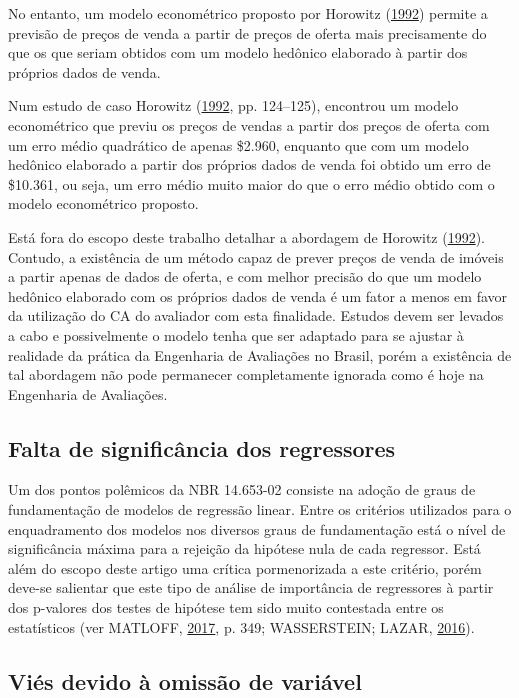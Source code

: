 \documentclass[
  a4paper, 11pt]{article}
\begin{document}
No entanto, um modelo econométrico proposto por Horowitz
(\protect\hyperlink{ref-horowitz}{1992}) permite a previsão de preços de
venda a partir de preços de oferta mais precisamente do que os que
seriam obtidos com um modelo hedônico elaborado à partir dos próprios
dados de venda.

Num estudo de caso Horowitz (\protect\hyperlink{ref-horowitz}{1992}, pp.
124--125), encontrou um modelo econométrico que previu os preços de
vendas a partir dos preços de oferta com um erro médio quadrático de
apenas \$2.960, enquanto que com um modelo hedônico elaborado a partir
dos próprios dados de venda foi obtido um erro de \$10.361, ou seja, um
erro médio muito maior do que o erro médio obtido com o modelo
econométrico proposto.

Está fora do escopo deste trabalho detalhar a abordagem de Horowitz
(\protect\hyperlink{ref-horowitz}{1992}). Contudo, a existência de um
método capaz de prever preços de venda de imóveis a partir apenas de
dados de oferta, e com melhor precisão do que um modelo hedônico
elaborado com os próprios dados de venda é um fator a menos em favor da
utilização do CA do avaliador com esta finalidade. Estudos devem ser
levados a cabo e possivelmente o modelo tenha que ser adaptado para se
ajustar à realidade da prática da Engenharia de Avaliações no Brasil,
porém a existência de tal abordagem não pode permanecer completamente
ignorada como é hoje na Engenharia de Avaliações.

\hypertarget{falta-de-significuxe2ncia-dos-regressores}{%
\subsection{Falta de significância dos
regressores}\label{falta-de-significuxe2ncia-dos-regressores}}

Um dos pontos polêmicos da NBR 14.653-02 consiste na adoção de graus de
fundamentação de modelos de regressão linear. Entre os critérios
utilizados para o enquadramento dos modelos nos diversos graus de
fundamentação está o nível de significância máxima para a rejeição da
hipótese nula de cada regressor. Está além do escopo deste artigo uma
crítica pormenorizada a este critério, porém deve-se salientar que este
tipo de análise de importância de regressores à partir dos p-valores dos
testes de hipótese tem sido muito contestada entre os estatísticos (ver
MATLOFF, \protect\hyperlink{ref-matloff2017}{2017}, p. 349; WASSERSTEIN;
LAZAR, \protect\hyperlink{ref-ASA}{2016}).

\hypertarget{viuxe9s-devido-uxe0-omissuxe3o-de-variuxe1vel}{%
\subsection{Viés devido à omissão de
variável}\label{viuxe9s-devido-uxe0-omissuxe3o-de-variuxe1vel}}
\end{document}
